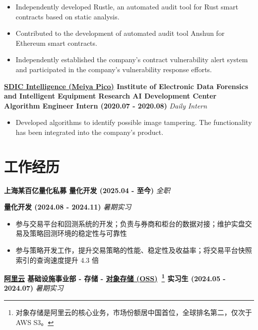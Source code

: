     \begin{itemize}
        \item Independently developed Rustle, an automated audit tool for Rust smart contracts based on static analysis.
        \item Contributed to the development of automated audit tool Anshun for Ethereum smart contracts.
        \item Independently established the company's contract vulnerability alert system and participated in the company's vulnerability response efforts.
    \end{itemize}

    \noindent\textbf{\href{https://300188.cn}{SDIC Intelligence (Meiya Pico)} \textbar{} Institute of Electronic Data Forensics and Intelligent Equipment Research AI Development Center \textbar{} Algorithm Engineer Intern (2020.07 - 2020.08)} \hfill \textsl{Daily Intern}

    \begin{itemize}
        \item Developed algorithms to identify possible image tampering. The functionality has been integrated into the company's product.
    \end{itemize}

\else

    \section*{工作经历}

    \noindent\textbf{上海某百亿量化私募 \textbar{} 量化开发 (2025.04 - 至今)} \hfill \textsl{全职}

    \noindent\textbf{\phantom{上海某百亿量化私募} \textbar{} 量化开发 (2024.08 - 2024.11)} \hfill \textsl{暑期实习}

    \begin{itemize}
        \item 参与交易平台和回测系统的开发；负责与券商和柜台的数据对接；维护实盘交易及策略回测环境的稳定性与可靠性
        \item 参与策略开发工作，提升交易策略的性能、稳定性及收益率；将交易平台快照索引的查询速度提升 4.3 倍
    \end{itemize}

    \noindent\textbf{\href{https://www.aliyun.com}{阿里云} \textbar{} 基础设施事业部 - 存储 - \href{https://www.aliyun.com/product/oss}{对象存储 (OSS)}~\footnote{对象存储是阿里云的核心业务，市场份额居中国首位，全球排名第二，仅次于 AWS S3。} \textbar{} 实习生 (2024.05 - 2024.07)} \hfill \textsl{暑期实习}

